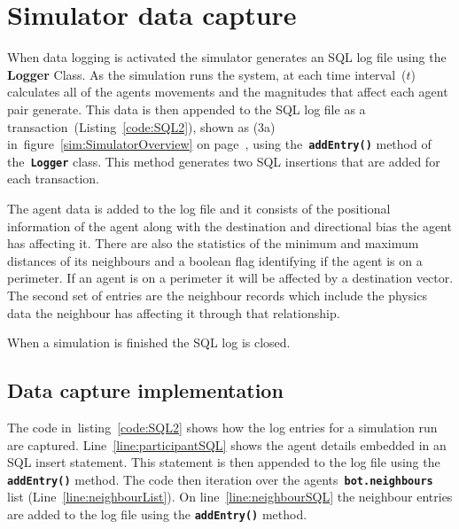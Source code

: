 \chapter{Simulator data capture}\label{app5}

When data logging is activated the simulator generates an SQL log file using the \textbf{Logger} Class. As the simulation runs the system, at each time interval~($t$) calculates all of the agents movements and the magnitudes that affect each agent pair generate. This data is then appended to the SQL log file as a transaction~(Listing~\ref{code:SQL2}), shown as (3a) in~figure~\ref{sim:SimulatorOverview} on page~\pageref{sim:SimulatorOverview}, using the~\texttt{\textbf{addEntry()}} method of the~\texttt{\textbf{Logger}} class. This method generates two SQL insertions that are added for each transaction. 

The agent data is added to the log file and it consists of the positional information of the agent along with the destination and directional bias the agent has affecting it. There are also the statistics of the minimum and maximum distances of its neighbours and a boolean flag identifying if the agent is on a perimeter. If an agent is on a perimeter it will be affected by a destination vector. The second set of entries are the neighbour records which include the physics data the neighbour has affecting it through that relationship. 

When a simulation is finished the SQL log is closed. 

\section{Data capture implementation}
The code in~listing~\ref{code:SQL2} shows how the log entries for a simulation run are captured. Line~\ref{line:participantSQL} shows the agent details embedded in an SQL insert statement. This statement is then appended to the log file using the \texttt{\textbf{addEntry()}} method. The code then iteration over the agents~\texttt{\textbf{bot.neighbours}} list (Line~\ref{line:neighbourList}). On line~\ref{line:neighbourSQL} the neighbour entries are added to the log file using the \texttt{\textbf{addEntry()}} method.

